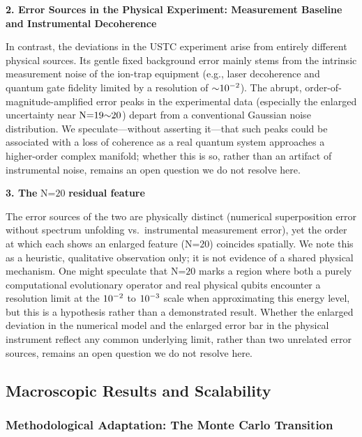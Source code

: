 \documentclass[fleqn,10pt]{wlscirep}
\begin{document}
\textbf{2. Error Sources in the Physical Experiment: Measurement Baseline
and Instrumental Decoherence}

In contrast, the deviations in the USTC experiment arise from
entirely different physical sources. Its gentle fixed background error
mainly stems from the intrinsic measurement noise of the ion-trap
equipment (e.g., laser decoherence and quantum gate fidelity limited by
a resolution of \(\text{\ensuremath{\sim}}\text{10}^{\text{\ensuremath{-}2}}\)). The
abrupt, order-of-magnitude-amplified error peaks in the
experimental data (especially the enlarged uncertainty near
\(\text{N}\text{=19\ensuremath{\sim}20}\)) depart from a conventional Gaussian noise
distribution. We speculate---without asserting it---that such peaks
could be associated with a loss of coherence as a real quantum system
approaches a higher-order complex manifold; whether this is so, rather
than an artifact of instrumental noise, remains an open question we do
not resolve here.

\textbf{3. The} \(\text{N}\text{=20}\)
\textbf{residual feature}

The error sources of the two are physically distinct
(numerical superposition error without spectrum unfolding vs.~instrumental
measurement error), yet the order at which each shows an enlarged feature
(\(\text{N}\text{=20}\)) coincides spatially. We note this as a heuristic,
qualitative observation only; it is not evidence of a shared physical
mechanism. One might speculate that \(\text{N}\text{=20}\) marks a region
where both a purely computational evolutionary operator and real physical
qubits encounter a resolution limit at the \(\text{10}^{\text{\ensuremath{-}2}}\) to
\(\text{10}^{\text{\ensuremath{-}3}}\) scale when approximating this energy level, but
this is a hypothesis rather than a demonstrated result. Whether the enlarged
deviation in the numerical model and the enlarged error bar in the physical
instrument reflect any common underlying limit, rather than two unrelated
error sources, remains an open question we do not resolve here.

\subsection*{Macroscopic Results and Scalability}

\subsubsection*{Methodological Adaptation: The Monte Carlo Transition}
\end{document}
